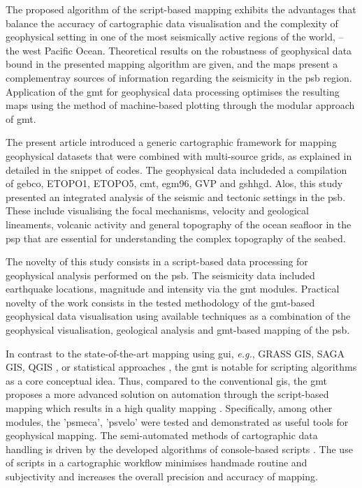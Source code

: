 \documentclass{rrparticle}
\begin{document}
The proposed algorithm of the script-based mapping exhibits the advantages that balance the accuracy of cartographic data visualisation and the complexity of geophysical setting in one of the most seismically active regions of the world, -- the west Pacific Ocean. Theoretical results on the robustness of geophysical data bound in the presented mapping algorithm are given, and the maps present a complementray sources of information regarding the seismicity in the \ac{psb} region. Application of the \ac{gmt} for geophysical data processing optimises the resulting maps using the method of machine-based plotting through the modular approach of \ac{gmt}.
 
The present article introduced a generic cartographic framework for mapping geophysical datasets that were combined with multi-source grids, as explained in detailed in the snippet of codes. The geophysical data includeded a compilation of \ac{gebco}, ETOPO1, ETOPO5, \ac{cmt}, \ac{egm96}, GVP and \ac{gshhgd}. Alos, this study presented an integrated analysis of the seismic and tectonic settings in the \ac{psb}. These include visualising the focal mechanisms, velocity and geological lineaments, volcanic activity and general topography of the ocean seafloor in the \ac{psp} that are essential for understanding the complex topography of the seabed. 

The novelty of this study consists in a script-based data processing for geophysical analysis performed on the \ac{psb}. The seismicity data included earthquake locations, magnitude and intensity via the \ac{gmt} modules. Practical novelty of the work consists in the tested methodology of the \ac{gmt}-based geophysical data visualisation using available techniques \cite{Lemenkova2022a,Lemenkova2022b} as a combination of the geophysical visualisation, geological analysis and \ac{gmt}-based mapping of the \ac{psb}. 

In contrast to the state-of-the-art mapping using \ac{gui}, \emph{e.g.}, GRASS GIS, SAGA GIS, QGIS \cite{Lemenkova2021d,Lemenkova2020e,Klauco2013,Klauco2017,Lemenkova2021b}, or statistical approaches \cite{Lemenkova2019e,Lemenkova2019f}, the \ac{gmt} is notable for scripting algorithms as a core conceptual idea. Thus, compared to the conventional \ac{gis}, the \ac{gmt} proposes a more advanced solution on automation through the script-based mapping which results in a high quality mapping \cite{Lemenkova2020a,Lemenkova2020b,Lemenkova2020f,Lemenkova2020h,Lemenkova2020d}. Specifically, among other modules, the 'psmeca', 'psvelo' were tested and demonstrated as useful tools for geophysical mapping. The semi-automated methods of cartographic data handling is driven by the developed algorithms of console-based scripts \cite{Lemenkova2020c}. The use of scripts in a cartographic workflow minimises handmade routine and subjectivity and increases the overall precision and accuracy of mapping. 
\end{document}
